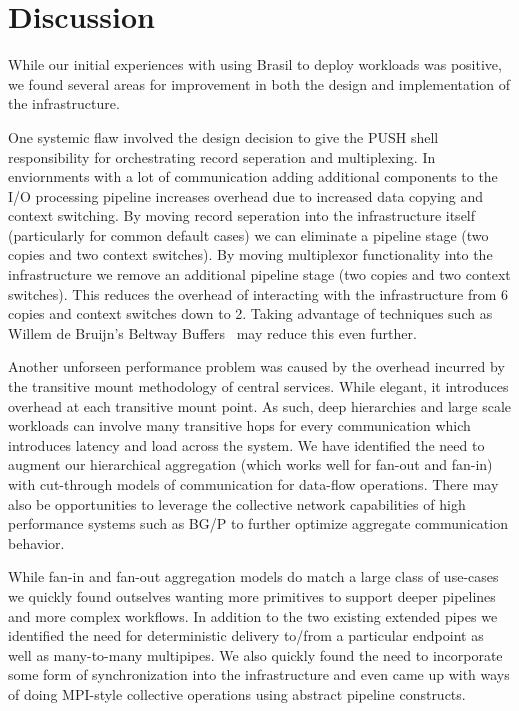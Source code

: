 \section{Discussion}

While our initial experiences with using Brasil to deploy
workloads was positive, we found several areas for improvement
in both the design and implementation of the infrastructure.

One systemic flaw involved the design decision to give the PUSH
shell responsibility for orchestrating record seperation and 
multiplexing.  In enviornments with a lot of communication 
adding additional components to the I/O processing pipeline 
increases overhead due to increased data copying and context
switching.  By moving record seperation into the infrastructure
itself (particularly for common default cases) we can eliminate
a pipeline stage (two copies and two context switches).  By moving
multiplexor functionality into the infrastructure we remove an
additional pipeline stage (two copies and two context switches).
This reduces the overhead of interacting with the infrastructure 
from 6 copies and context switches down to 2.  Taking advantage
of techniques such as Willem de Bruijn's Beltway Buffers~\cite{beltway}
may reduce this even further.

Another unforseen performance problem was caused by the overhead
incurred by the transitive mount methodology of central services.
While elegant, it introduces overhead at each transitive mount point.
As such, deep hierarchies and large scale workloads can involve 
many transitive hops for every communication which introduces latency
and load across the system.  We have identified the need to augment
our hierarchical aggregation (which works well for fan-out and fan-in)
with cut-through models of communication for data-flow operations.
There may also be opportunities to leverage the collective network
capabilities of high performance systems such as BG/P to further
optimize aggregate communication behavior.

While fan-in and fan-out aggregation models do match a large class
of use-cases we quickly found outselves wanting more primitives to
support deeper pipelines and more complex workflows.  In addition
to the two existing extended pipes we identified the need for
deterministic delivery to/from a particular endpoint as well as
many-to-many multipipes.  We also quickly found the need to
incorporate some form of synchronization into the infrastructure
and even came up with ways of doing MPI-style collective operations
using abstract pipeline constructs.

